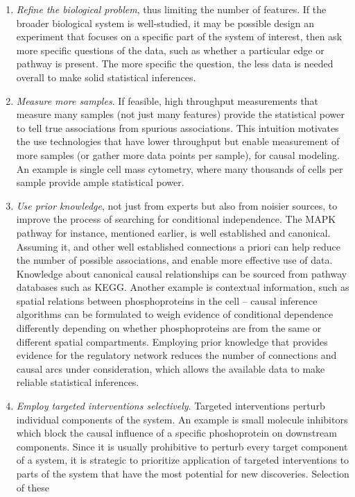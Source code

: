 \documentclass[journal=jacsat,manuscript=article]{achemso}
\begin{document}
\begin{enumerate}
\item \textit{Refine the biological problem}, thus limiting the number of features. If
the broader biological system is well-studied, it may be possible design
an experiment that focuses on a specific part of the system of interest,
then ask more specific questions of the data, such as whether a
particular edge or pathway is present. The more specific the question,
the less data is needed overall to make solid statistical inferences.
\item \textit{Measure more samples}. If feasible, high throughput measurements that
measure many samples (not just many features) provide the statistical
power to tell true associations from spurious associations. This
intuition motivates the use technologies that have lower throughput but
enable measurement of more samples (or gather more data points per
sample), for causal modeling. An example is single cell mass cytometry,
where many thousands of cells per sample provide ample statistical
power.
\item \textit{Use prior knowledge}, not just from experts but also from noisier
sources, to improve the process of searching for conditional
independence. The MAPK pathway for instance, mentioned earlier, is well
established and canonical. Assuming it, and other well established
connections a priori can help reduce the number of possible
associations, and enable more effective use of data. Knowledge about
canonical causal relationships can be sourced from pathway databases
such as KEGG. Another example is contextual information, such as spatial
relations between phosphoproteins in the cell -- causal inference
algorithms can be formulated to weigh evidence of conditional dependence
differently depending on whether phosphoproteins are from the same or
different spatial compartments. Employing prior knowledge that provides
evidence for the regulatory network reduces the number of connections
and causal arcs under consideration, which allows the available data to
make reliable statistical inferences.
\item \textit{Employ targeted interventions selectively}. Targeted interventions
perturb individual components of the system. An example is small
molecule inhibitors which block the causal influence of a specific
phoshoprotein on downstream components. Since it is usually prohibitive
to perturb every target component of a system, it is strategic to
prioritize application of targeted interventions to parts of the system
that have the most potential for new discoveries. Selection of these

\end{enumerate}
\end{document}
